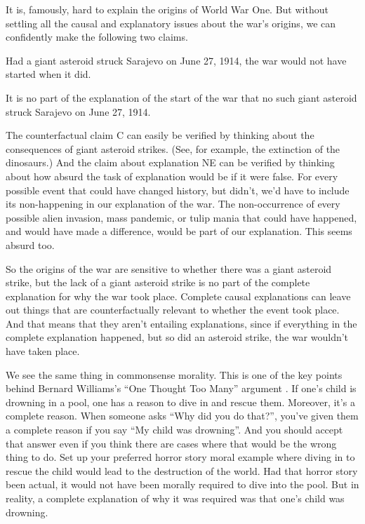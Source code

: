 \documentclass[
  11pt,
]{book}
\providecommand{\tightlist}{%
  \setlength{\itemsep}{0pt}\setlength{\parskip}{0pt}}
\begin{document}
It is, famously, hard to explain the origins of World War One. But without settling all the causal and explanatory issues about the war's origins, we can confidently make the following two claims.

\begin{description}
\tightlist
\item[C]
Had a giant asteroid struck Sarajevo on June 27, 1914, the war would not have started when it did.
\item[NE]
It is no part of the explanation of the start of the war that no such giant asteroid struck Sarajevo on June 27, 1914.
\end{description}

The counterfactual claim C can easily be verified by thinking about the consequences of giant asteroid strikes. (See, for example, the extinction of the dinosaurs.) And the claim about explanation NE can be verified by thinking about how absurd the task of explanation would be if it were false. For every possible event that could have changed history, but didn't, we'd have to include its non-happening in our explanation of the war. The non-occurrence of every possible alien invasion, mass pandemic, or tulip mania that could have happened, and would have made a difference, would be part of our explanation. This seems absurd too.

So the origins of the war are sensitive to whether there was a giant asteroid strike, but the lack of a giant asteroid strike is no part of the complete explanation for why the war took place. Complete causal explanations can leave out things that are counterfactually relevant to whether the event took place. And that means that they aren't entailing explanations, since if everything in the complete explanation happened, but so did an asteroid strike, the war wouldn't have taken place.

We see the same thing in commonsense morality. This is one of the key points behind Bernard Williams's ``One Thought Too Many'' argument \citep{Williams1976}. If one's child is drowning in a pool, one has a reason to dive in and rescue them. Moreover, it's a complete reason. When someone asks ``Why did you do that?'', you've given them a complete reason if you say ``My child was drowning''. And you should accept that answer even if you think there are cases where that would be the wrong thing to do. Set up your preferred horror story moral example where diving in to rescue the child would lead to the destruction of the world. Had that horror story been actual, it would not have been morally required to dive into the pool. But in reality, a complete explanation of why it was required was that one's child was drowning.
\end{document}
